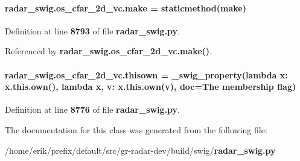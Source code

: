 \paragraph[{make}]{\setlength{\rightskip}{0pt plus 5cm}radar\+\_\+swig.\+os\+\_\+cfar\+\_\+2d\+\_\+vc.\+make = staticmethod(make)\hspace{0.3cm}{\ttfamily [static]}}\label{classradar__swig_1_1os__cfar__2d__vc_a118a63508e6a1b950aa9674b42c8a87b}


Definition at line {\bf 8793} of file {\bf radar\+\_\+swig.\+py}.



Referenced by {\bf radar\+\_\+swig.\+os\+\_\+cfar\+\_\+2d\+\_\+vc.\+make()}.

\paragraph[{thisown}]{\setlength{\rightskip}{0pt plus 5cm}radar\+\_\+swig.\+os\+\_\+cfar\+\_\+2d\+\_\+vc.\+thisown = {\bf \+\_\+swig\+\_\+property}(lambda x\+: x.\+this.\+own(), lambda {\bf x}, v\+: x.\+this.\+own(v), doc=\textquotesingle{}The membership flag\textquotesingle{})\hspace{0.3cm}{\ttfamily [static]}}\label{classradar__swig_1_1os__cfar__2d__vc_af6f0551f1f7d168b40b069e774ef9b93}


Definition at line {\bf 8776} of file {\bf radar\+\_\+swig.\+py}.



The documentation for this class was generated from the following file\+:\begin{DoxyCompactItemize}
\item 
/home/erik/prefix/default/src/gr-\/radar-\/dev/build/swig/{\bf radar\+\_\+swig.\+py}\end{DoxyCompactItemize}
